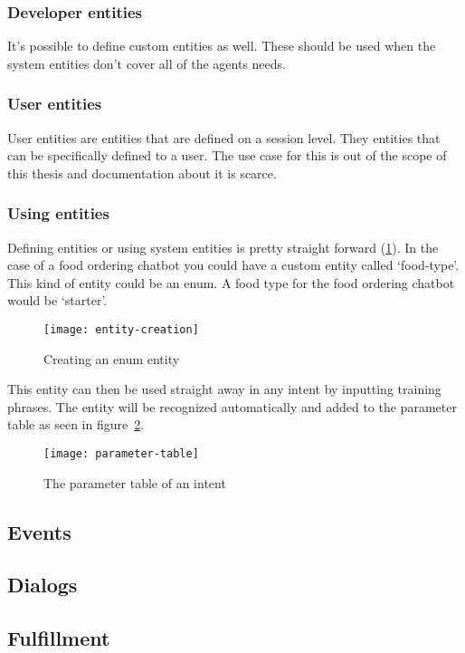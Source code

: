 \subsubsection{Developer entities}

It's possible to define custom entities as well. These should be used when the system entities don't cover all of the agents needs.

\subsubsection{User entities}

User entities are entities that are defined on a session level. They entities that can be specifically defined to a user. The use case for this is out of the scope of this thesis and documentation about it is scarce.

\subsubsection{Using entities}

Defining entities or using system entities is pretty straight forward (\ref{fig:entity-creation}). In the case of a food ordering chatbot you could have a custom entity called `food-type'. This kind of entity could be an enum. A food type for the food ordering chatbot would be `starter'.

\begin{figure}[ht]
	\centering
	\texttt{[image: entity-creation]}\label{fig:entity-creation}
	\caption{Creating an enum entity}
\end{figure}

This entity can then be used straight away in any intent by inputting training phrases. The entity will be recognized automatically and added to the parameter table as seen in figure~\ref{fig:parameter-table}.

\begin{figure}[ht]
	\centering
	\texttt{[image: parameter-table]}\label{fig:parameter-table}
	\caption{The parameter table of an intent}
\end{figure}

\subsection{Events}

\subsection{Dialogs}

\subsection{Fulfillment}